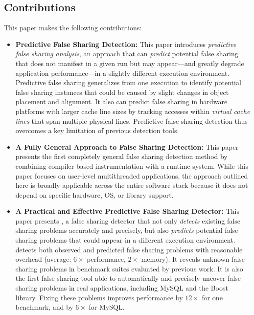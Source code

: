 \subsection*{Contributions}

This paper makes the following contributions:

\begin{itemize}


\item
\textbf{Predictive False Sharing Detection:} This paper introduces \emph{predictive false sharing analysis}, an approach that can \emph{predict} potential false sharing that does not manifest in a given run but may appear---and greatly degrade application performance---in a slightly different execution environment. 
Predictive false sharing generalizes from one execution to identify potential false sharing instances that could be caused by slight changes in object placement and alignment.
It also can predict false sharing in hardware platforms with larger cache line sizes by tracking accesses within \emph{virtual cache lines} that span multiple physical lines. Predictive false sharing detection thus overcomes a key limitation of previous detection tools.

\item
\textbf{A Fully General Approach to False Sharing Detection:} This paper presents the first completely general false sharing detection method by combining compiler-based instrumentation with a runtime system. While this
paper focuses on user-level multithreaded applications, the approach outlined here is broadly applicable across the entire software stack because it does not depend on specific hardware, OS, or library support.

\item
\textbf{A Practical and Effective Predictive False Sharing Detector:} 
This paper presents \Predator{}, a false sharing detector that not only \emph{detects} existing false sharing problems accurately and precisely, but also \emph{predicts} potential false sharing problems that could appear in a different execution environment.
\Predator{} detects both observed and predicted false sharing 
problems with reasonable overhead (average: $6\times$ performance, $2\times$ memory).  It reveals unknown false sharing problems in benchmark suites evaluated by previous work. It is also the first false sharing tool able to automatically and precisely uncover
false sharing problems in real applications, including 
MySQL and the Boost library. Fixing these problems improves performance by $12\times$ for one benchmark, and by $6\times$ for MySQL.


\end{itemize}

